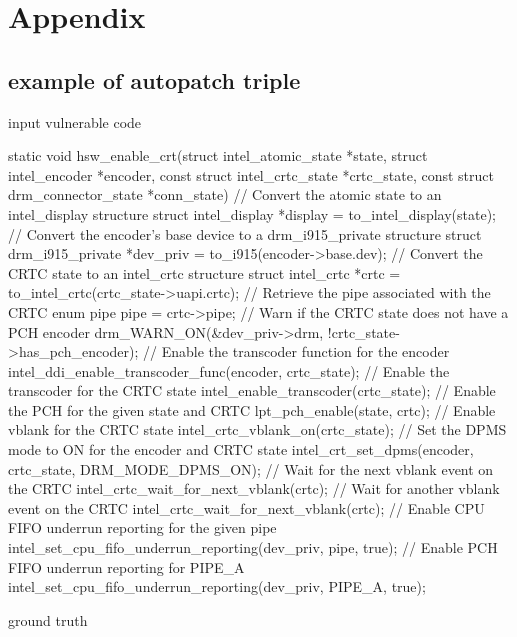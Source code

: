 \chapter{Appendix}\label{chapter:appendix}

\section{example of autopatch triple}\label{chapter:appendix_example_autopatch}

input vulnerable code
\begin{lightcpp}
    static void hsw_enable_crt(struct intel_atomic_state *state,
struct intel_encoder *encoder,
const struct intel_crtc_state *crtc_state,
const struct drm_connector_state *conn_state)
{
// Convert the atomic state to an intel_display structure
struct intel_display *display = to_intel_display(state);
// Convert the encoder's base device to a drm_i915_private structure
struct drm_i915_private *dev_priv = to_i915(encoder->base.dev);
// Convert the CRTC state to an intel_crtc structure
struct intel_crtc *crtc = to_intel_crtc(crtc_state->uapi.crtc);
// Retrieve the pipe associated with the CRTC
enum pipe pipe = crtc->pipe;
// Warn if the CRTC state does not have a PCH encoder
drm_WARN_ON(&dev_priv->drm, !crtc_state->has_pch_encoder);
// Enable the transcoder function for the encoder
intel_ddi_enable_transcoder_func(encoder, crtc_state);
// Enable the transcoder for the CRTC state
intel_enable_transcoder(crtc_state);
// Enable the PCH for the given state and CRTC
lpt_pch_enable(state, crtc);
// Enable vblank for the CRTC state
intel_crtc_vblank_on(crtc_state);
// Set the DPMS mode to ON for the encoder and CRTC state
intel_crt_set_dpms(encoder, crtc_state, DRM_MODE_DPMS_ON);
// Wait for the next vblank event on the CRTC
intel_crtc_wait_for_next_vblank(crtc);
// Wait for another vblank event on the CRTC
intel_crtc_wait_for_next_vblank(crtc);
// Enable CPU FIFO underrun reporting for the given pipe
intel_set_cpu_fifo_underrun_reporting(dev_priv, pipe, true);
// Enable PCH FIFO underrun reporting for PIPE_A
intel_set_cpu_fifo_underrun_reporting(dev_priv, PIPE_A, true);
}
\end{lightcpp}
ground truth

